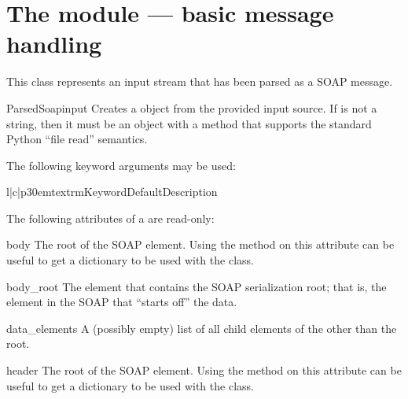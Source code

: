 \chapter{The  module --- basic message handling}

This class represents an input stream that has been parsed as a SOAP
message.

\begin{classdesc}{ParsedSoap}{input}
Creates a  object from the provided input source.
If  is not a string, then it must be an object with a
 method that supports the standard Python ``file read''
semantics.

The following keyword arguments may be used:

\begin{tableiii}{l|c|p{30em}}{textrm}{Keyword}{Default}{Description}
\end{tableiii}

\end{classdesc}

The following attributes of a  are read-only:

\begin{memberdesc}{body}
The root of the SOAP  element.
Using the  method on this attribute can be useful
to get a dictionary to be used with the  class.
\end{memberdesc}

\begin{memberdesc}{body_root}
The element that contains the SOAP serialization root; that is,
the element in the SOAP  that ``starts off'' the data.
\end{memberdesc}

\begin{memberdesc}{data_elements}
A (possibly empty) list of all child elements of the  other
than the root.
\end{memberdesc}

\begin{memberdesc}{header}
The root of the SOAP  element.
Using the  method on this attribute can be useful
to get a dictionary to be used with the  class.
\end{memberdesc}

